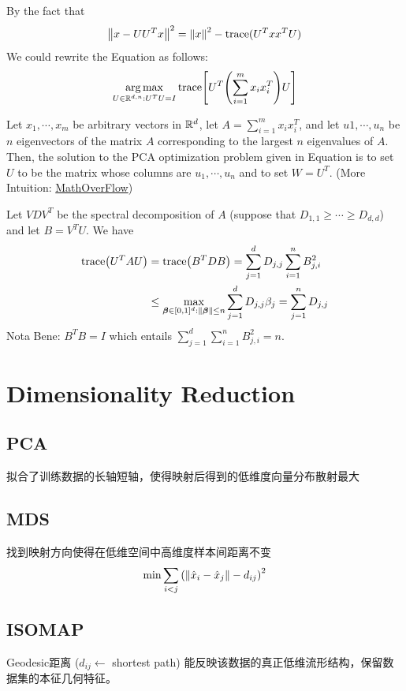 \documentclass[a4paper,landscape]{article}
\begin{document}
\begin{tiny}
\begin{multicols}{4}
		By the fact that
		\[
			\norm{x-UU^Tx}^2=\norm{x}^2-\mathrm{trace}(U^Txx^TU)
		\] We could rewrite the Equation as follows:
		\[
			\mathop{\arg\max}_{U\in\mathbb{R}^{d,n}:U^TU=I}\mathrm{trace}\qty[U^T \qty(\sum^{m}_{i=1}x_ix_i^T) U]
		\]
		\begin{thm}
			Let $x_1,\cdots, x_m$ be arbitrary vectors in $\mathbb{R}^d$,
			let $A = \sum^{m}_{i=1}  x_ix_i^T$,
			and let $u1,\cdots, u_n$ be $n$ eigenvectors of the matrix $A$ corresponding to the largest $n$ eigenvalues of $A$.
			Then, the solution to the PCA optimization problem given in Equation is to set $U$ to be the matrix whose columns are $u_1,\cdots,u_n$ and to set $W = U^T$.
			(More Intuition: \href{https://mathoverflow.net/questions/248198/maximizing-trace-of-mathrm-vt-mathrm-a-mathrm-v-for-mathrm-a-symmetric}{MathOverFlow})
		\end{thm}
		\begin{prf}
			Let $VDV^T$ be the spectral decomposition of  $A$ (suppose that $D_{1,1}\ge \cdots\ge D_{d,d}$) and let $B=V^TU$. We have
			\[
				\begin{aligned}
					\mathrm{trace}\qty(U^TAU)
					 & =
					\mathrm{trace}\qty(B^TDB)
					=
					\sum^{d}_{j=1} D_{j,j}\sum^{n}_{i=1} B^2_{j,i}
					\\&\le
					\max_{\boldsymbol{\beta}\in[0,1]^d:\norm{\boldsymbol{\beta}}\le n}\sum^{d}_{j=1} D_{j,j}\beta_j
					=
					\sum^{n}_{j=1} D_{j,j}
				\end{aligned}
			\]
			Nota Bene: $B^TB=I$ which entails  $ \sum^{d}_{j=1} \sum^{n}_{i=1} B^2_{j,i}=n $.
		\end{prf}

		\section{Dimensionality Reduction}

		\subsection{PCA}
		拟合了训练数据的长轴短轴，使得映射后得到的低维度向量分布散射最大

		\subsection{MDS}
		找到映射方向使得在低维空间中高维度样本间距离不变
		\[
			\min \sum_{i<j}\qty(\norm{\hat{x}_i-\hat{x}_j}-d_{ij})^2
		\]

		\subsection{ISOMAP}
		Geodesic距离 ($d_{ij}\gets$ shortest path) 能反映该数据的真正低维流形结构，保留数据集的本征几何特征。


\end{multicols}
\end{tiny}
\end{document}
